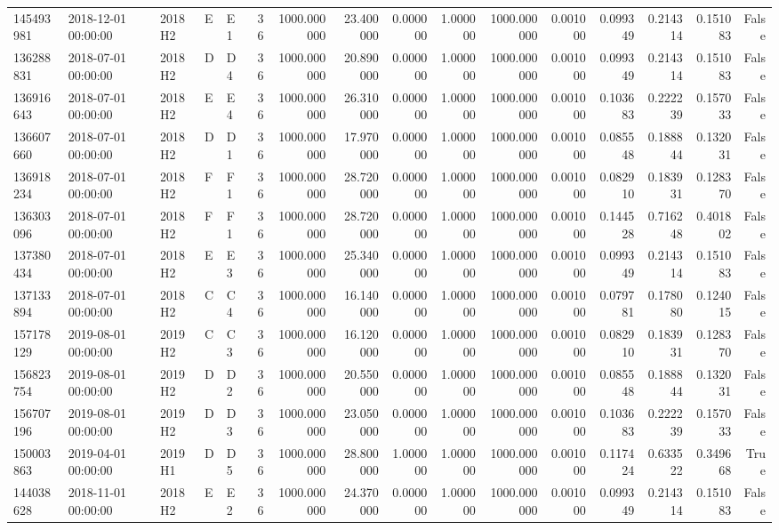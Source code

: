\begin{tabular}{lllllrrrrrrrrrrr}
145493981 & 2018-12-01 00:00:00 & 2018H2 & E & E1 & 36 & 1000.000000 & 23.400000 & 0.000000 & 1.000000 & 1000.000000 & 0.001000 & 0.099349 & 0.214314 & 0.151083 & False \\
136288831 & 2018-07-01 00:00:00 & 2018H2 & D & D4 & 36 & 1000.000000 & 20.890000 & 0.000000 & 1.000000 & 1000.000000 & 0.001000 & 0.099349 & 0.214314 & 0.151083 & False \\
136916643 & 2018-07-01 00:00:00 & 2018H2 & E & E4 & 36 & 1000.000000 & 26.310000 & 0.000000 & 1.000000 & 1000.000000 & 0.001000 & 0.103683 & 0.222239 & 0.157033 & False \\
136607660 & 2018-07-01 00:00:00 & 2018H2 & D & D1 & 36 & 1000.000000 & 17.970000 & 0.000000 & 1.000000 & 1000.000000 & 0.001000 & 0.085548 & 0.188844 & 0.132031 & False \\
136918234 & 2018-07-01 00:00:00 & 2018H2 & F & F1 & 36 & 1000.000000 & 28.720000 & 0.000000 & 1.000000 & 1000.000000 & 0.001000 & 0.082910 & 0.183931 & 0.128370 & False \\
136303096 & 2018-07-01 00:00:00 & 2018H2 & F & F1 & 36 & 1000.000000 & 28.720000 & 0.000000 & 1.000000 & 1000.000000 & 0.001000 & 0.144528 & 0.716248 & 0.401802 & False \\
137380434 & 2018-07-01 00:00:00 & 2018H2 & E & E3 & 36 & 1000.000000 & 25.340000 & 0.000000 & 1.000000 & 1000.000000 & 0.001000 & 0.099349 & 0.214314 & 0.151083 & False \\
137133894 & 2018-07-01 00:00:00 & 2018H2 & C & C4 & 36 & 1000.000000 & 16.140000 & 0.000000 & 1.000000 & 1000.000000 & 0.001000 & 0.079781 & 0.178080 & 0.124015 & False \\
157178129 & 2019-08-01 00:00:00 & 2019H2 & C & C3 & 36 & 1000.000000 & 16.120000 & 0.000000 & 1.000000 & 1000.000000 & 0.001000 & 0.082910 & 0.183931 & 0.128370 & False \\
156823754 & 2019-08-01 00:00:00 & 2019H2 & D & D2 & 36 & 1000.000000 & 20.550000 & 0.000000 & 1.000000 & 1000.000000 & 0.001000 & 0.085548 & 0.188844 & 0.132031 & False \\
156707196 & 2019-08-01 00:00:00 & 2019H2 & D & D3 & 36 & 1000.000000 & 23.050000 & 0.000000 & 1.000000 & 1000.000000 & 0.001000 & 0.103683 & 0.222239 & 0.157033 & False \\
150003863 & 2019-04-01 00:00:00 & 2019H1 & D & D5 & 36 & 1000.000000 & 28.800000 & 1.000000 & 1.000000 & 1000.000000 & 0.001000 & 0.117424 & 0.633522 & 0.349668 & True \\
144038628 & 2018-11-01 00:00:00 & 2018H2 & E & E2 & 36 & 1000.000000 & 24.370000 & 0.000000 & 1.000000 & 1000.000000 & 0.001000 & 0.099349 & 0.214314 & 0.151083 & False \\

\end{tabular}
